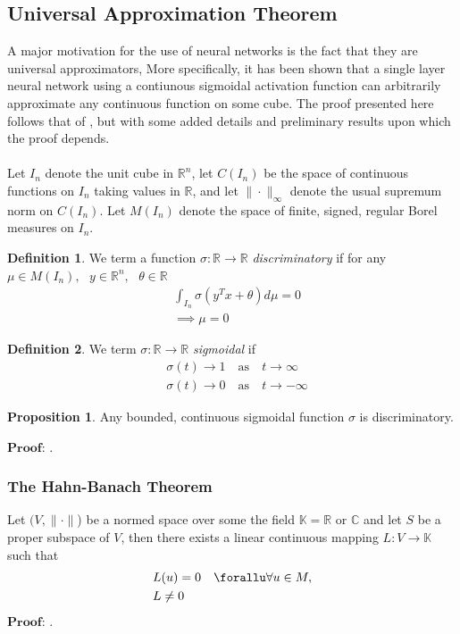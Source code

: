\documentclass{article}
\theoremstyle{definition}
\newtheorem{definition}{Definition}[section]
\newtheorem{proposition}{Proposition}
\begin{document}
\subsection{Universal Approximation Theorem}
A major motivation for the use of neural networks is the fact that they are universal approximators, More specifically, it has been shown that a single layer neural network using a contiunous sigmoidal activation function can arbitrarily approximate any continuous function on some cube. The proof presented here follows that of \cite{cybenko1989approximation}, but with some added details and preliminary results upon which the proof depends.
\\\\
Let $I_n$ denote the unit cube in $\mathbb{R}^n$, let $C(I_n)$ be the space of continuous functions on $I_n$ taking values in $\mathbb{R}$, and let $\|\cdot\|_{\infty}$ denote the usual supremum norm on $C(I_n)$. Let $M(I_n)$ denote the space of finite, signed, regular Borel measures on $I_n$.
\begin{definition}
    We term a function $\sigma : \mathbb{R} \rightarrow \mathbb{R}$ \textit{discriminatory} if for any $\mu \in M(I_n), \text{ } y \in \mathbb{R}^n, \text{ }\theta \in \mathbb{R}$
\begin{align}
    &\int_{I_n} \sigma(y^T x + \theta) d\mu = 0\\
    & \implies \mu = 0
\end{align}
\end{definition}

\begin{definition}
    We term $\sigma : \mathbb{R} \rightarrow \mathbb{R}$ \textit{sigmoidal} if 
\begin{align}
    &\sigma(t) \rightarrow 1 \quad \text{as} \quad t\rightarrow \infty\\
    &\sigma(t) \rightarrow 0 \quad \text{as} \quad t\rightarrow -\infty
\end{align}
\end{definition}
\label{sigmoidal is discriminatory}
\begin{proposition}
    Any bounded, continuous sigmoidal function $\sigma$ is discriminatory.  
\end{proposition}
\noindent
$\textbf{Proof}$: \cite{cybenko1989approximation}.

\subsubsection{The Hahn-Banach Theorem}
Let $(V, \|\cdot \|$) be a normed space over some the field $\mathbb{K}=\mathbb{R}$ or $\mathbb{C}$ and let $S$ be a proper subspace of $V$, then there exists a linear continuous mapping $L:V\rightarrow \mathbb{K}$ such that 
\begin{align}
    &L(u) = 0 \quad \forallu \forall u \in M,\\
    &L \neq 0
\end{align}
$\textbf{Proof}$: \cite{Ebobisse2024}.
\end{document}
